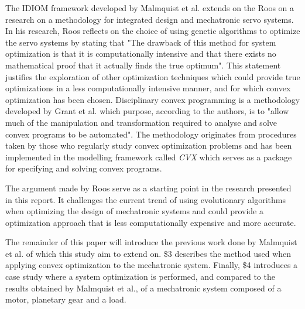 \par
The IDIOM framework developed by Malmquist et al. extends on the Roos \cite{roos2007} on a research on a methodology for integrated design and mechatronic servo systems. In his research, Roos reflects on the choice of using genetic algorithms to optimize the servo systems by stating that "The drawback of this method for system optimization is that it is computationally intensive and that there exists no mathematical proof that it actually finds the true optimum". This statement justifies the exploration of other optimization techniques which could provide true optimizations in a less computationally intensive manner, and for which convex optimization has been chosen. Disciplinary convex programming is a methodology developed by Grant et al. \cite{gb08} which purpose, according to the authors, is to "allow much of the manipulation and transformation required to analyse and solve convex programs to be automated". The methodology originates from procedures taken by those who regularly study convex optimization problems and has been implemented in the modelling framework called \textit{CVX} \cite{cvx} which serves as a package for specifying and solving convex programs.

\par
The argument made by Roos serve as a starting point in the research presented in this report. It challenges the current trend of using evolutionary algorithms when optimizing the design of mechatronic systems and could provide a optimization approach that is less computationally expensive and more accurate. 

\par
The remainder of this paper will introduce the previous work done by Malmquist et al. of which this study aim to extend on. \$3 describes the method used when applying convex optimization to the mechatronic system. Finally, \$4 introduces a case study where a system optimization is performed, and compared to the results obtained by Malmquist et al., of a mechatronic system composed of a motor, planetary gear and a load.  


